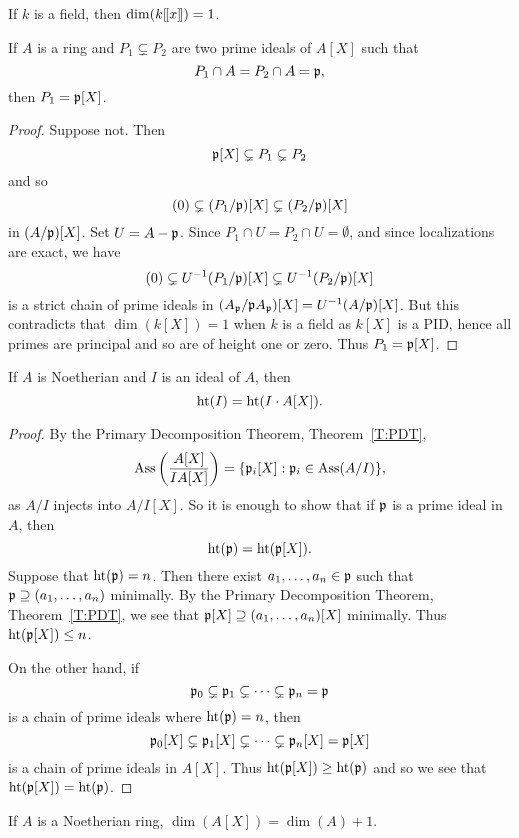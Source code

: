 \documentclass{ximera}
\begin{document}
\begin{example} If $k$ is a field, then $\dim(k[\hspace{-0.25ex}[ x ]\hspace{-0.25ex}]) = 1$.
\end{example}


\begin{lemma}\label{L:FT1} If $A$ is a ring and $P_1\subsetneq P_2$ are two prime ideals of $A[X]$ such that
\[
P_1\cap A = P_2\cap A = \mathfrak{p},
\]
then $P_1 = \mathfrak{p}[X]$.
\end{lemma}

\begin{proof} Suppose not. Then 
\[
\mathfrak{p}[X]\subsetneq P_1\subsetneq P_2 
\]
and so 
\[
(0) \subsetneq (P_1/\mathfrak{p})[X] \subsetneq (P_2/\mathfrak{p})[X]
\]
in $(A/\mathfrak{p}) [X]$. Set $U = A-\mathfrak{p}$.  Since $P_1 \cap U = P_2 \cap U = \emptyset$, and since localizations are exact, we have
\[
(0) \subsetneq U^{-1}(P_1/\mathfrak{p})[X] \subsetneq U^{-1}(P_2/\mathfrak{p})[X]
\]
is a strict chain of prime ideals in $(A_{\mathfrak{p}}/\mathfrak{p} A_{\mathfrak{p}})[X] = U^{-1}(A/\mathfrak{p})[X]$.  But this contradicts that $\dim(k[X]) = 1$ when $k$ is a field as $k[X]$ is a PID, hence all primes are principal and so are of height one or zero.  Thus $P_1 = \mathfrak{p}[X]$.
\end{proof}


\begin{lemma}\label{L:FT2} If $A$ is Noetherian and $I$ is an ideal of $A$, then
\[
\operatorname{ht}(I) = \operatorname{ht}(I\cdot A[X]).
\]
\end{lemma}

\begin{proof} By the Primary Decomposition Theorem, Theorem~\ref{T:PDT}, 
\[
\operatorname{Ass}\left(\frac{A[X]}{IA[X]}\right) = \{\mathfrak{p}_i[X]: \mathfrak{p}_i\in\operatorname{Ass}(A/I)\},
\]
as $A/I$ injects into $A/I [X]$. So it is enough to show that if $\mathfrak{p}$ is a prime ideal in $A$, then 
\[
\operatorname{ht}(\mathfrak{p}) = \operatorname{ht}(\mathfrak{p}[X]).
\]
Suppose that $\operatorname{ht}(\mathfrak{p}) = n$. Then there exist $a_1,\dots,a_n\in \mathfrak{p}$ such that $\mathfrak{p}\supseteq(a_1,\dots,a_n)$ minimally. By the Primary Decomposition Theorem, Theorem~\ref{T:PDT}, we see that $\mathfrak{p}[X]\supseteq(a_1,\dots,a_n)[X]$ minimally. Thus $\operatorname{ht}(\mathfrak{p}[X])\le n$.

On the other hand, if 
\[
\mathfrak{p}_0 \subsetneq \mathfrak{p}_1 \subsetneq \cdots \subsetneq \mathfrak{p}_n = \mathfrak{p}
\] 
is a chain of prime ideals where $\operatorname{ht}(\mathfrak{p}) = n$, then 
\[
\mathfrak{p}_0[X] \subsetneq \mathfrak{p}_1[X] \subsetneq \cdots \subsetneq \mathfrak{p}_n[X] = \mathfrak{p}[X]
\]
is a chain of prime ideals in $A[X]$. Thus $\operatorname{ht}(\mathfrak{p}[X])\ge \operatorname{ht}(\mathfrak{p})$ and so we see that $\operatorname{ht}(\mathfrak{p}[X]) = \operatorname{ht}(\mathfrak{p})$. 
\end{proof}


\begin{theorem} If $A$ is a Noetherian ring, $\dim(A[X]) = \dim(A) + 1$.
\end{theorem}
\end{document}

